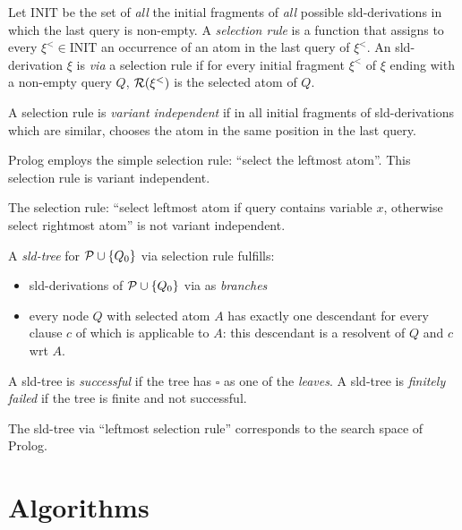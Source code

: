 \begin{dfn}
    Let \(\mathrm{INIT}\) be the set of \emph{all} the initial fragments of \emph{all} possible \gls{sld}-derivations in which the last query is non-empty.
    A \emph{selection rule} is a function that assigns to every \(\xi^{<} \in \mathrm{INIT}\) an occurrence of an atom in the last query of \(\xi^{<}\).
    An \gls{sld}-derivation \(\xi\) is \emph{via} a selection rule  if for every initial fragment \(\xi^{<}\) of \(\xi\) ending with a non-empty query \(Q\), \(\mathcal{R}(\xi^{<})\) is the selected atom of \(Q\).

    A selection rule  is \emph{variant independent} if in all initial fragments of \gls{sld}-derivations which are similar,  chooses the atom in the same position in the last query.
\end{dfn}

\begin{rem}
    Prolog employs the simple selection rule: ``select the leftmost atom''.    
    This selection rule is variant independent.
    
    The selection rule: ``select leftmost atom if query contains variable \(x\), otherwise select rightmost atom'' is not variant independent.
\end{rem}

\begin{dfn}
    A \emph{\gls{sld}-tree} for \(\mathcal{P} \cup \lbrace Q_0 \rbrace\) via selection rule  fulfills:
    \begin{itemize}
        \item \gls{sld}-derivations of \(\mathcal{P} \cup \lbrace Q_0 \rbrace\) via  as \emph{branches}
        \item every node \(Q\) with selected atom \(A\) has exactly one descendant for every clause \(c\) of \prog which is applicable to \(A\): this descendant is a resolvent of \(Q\) and \(c\) wrt \(A\). 
    \end{itemize}
    A \gls{sld}-tree is \emph{successful} if the tree has \(\square\) as one of the \emph{leaves}.
    A \gls{sld}-tree is \emph{finitely failed} if the tree is finite and not successful.
\end{dfn}

\begin{rem}
    The \gls{sld}-tree via ``leftmost selection rule'' corresponds to the search space of Prolog.
\end{rem}
\section{Algorithms}

